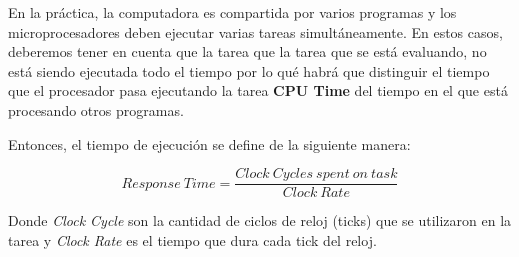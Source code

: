 En la práctica, la computadora es compartida por varios programas y los microprocesadores deben ejecutar varias tareas simultáneamente. En estos casos, deberemos tener en cuenta que la tarea que la tarea que se está evaluando, no está siendo ejecutada todo el tiempo por lo qué habrá que distinguir el tiempo que el procesador pasa ejecutando la tarea  \textbf{CPU Time} del tiempo en el que está procesando otros programas.

Entonces, el tiempo de ejecución se define de la siguiente manera:

$$Response~Time = \frac{Clock~Cycles~spent~on~task}{Clock~Rate}$$

Donde \textit{Clock Cycle} son la cantidad de ciclos de reloj (ticks) que se utilizaron en la tarea y \textit{Clock Rate} es el tiempo que dura cada tick del reloj.

\nocite{*}




